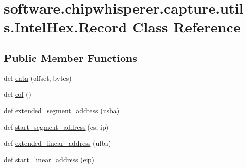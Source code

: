 \hypertarget{classsoftware_1_1chipwhisperer_1_1capture_1_1utils_1_1IntelHex_1_1Record}{}\section{software.\+chipwhisperer.\+capture.\+utils.\+Intel\+Hex.\+Record Class Reference}
\label{classsoftware_1_1chipwhisperer_1_1capture_1_1utils_1_1IntelHex_1_1Record}
\subsection*{Public Member Functions}
\begin{DoxyCompactItemize}
\item 
def \hyperlink{classsoftware_1_1chipwhisperer_1_1capture_1_1utils_1_1IntelHex_1_1Record_a1569da4fa0d9b1d4b55b231eacbd2c1a}{data} (offset, bytes)
\item 
def \hyperlink{classsoftware_1_1chipwhisperer_1_1capture_1_1utils_1_1IntelHex_1_1Record_a06ffc2b3d361d1ae984174bdf66355c4}{eof} ()
\item 
def \hyperlink{classsoftware_1_1chipwhisperer_1_1capture_1_1utils_1_1IntelHex_1_1Record_a0a701368eaee09b09a75f066c10855b1}{extended\+\_\+segment\+\_\+address} (usba)
\item 
def \hyperlink{classsoftware_1_1chipwhisperer_1_1capture_1_1utils_1_1IntelHex_1_1Record_afc7c6958ffa23dfb4806eb2700473401}{start\+\_\+segment\+\_\+address} (cs, ip)
\item 
def \hyperlink{classsoftware_1_1chipwhisperer_1_1capture_1_1utils_1_1IntelHex_1_1Record_a5dc9a50c782883c50958fe350dfecc06}{extended\+\_\+linear\+\_\+address} (ulba)
\item 
def \hyperlink{classsoftware_1_1chipwhisperer_1_1capture_1_1utils_1_1IntelHex_1_1Record_ad6f86854fcc9f437e7b26d89f54d16bd}{start\+\_\+linear\+\_\+address} (eip)
\end{DoxyCompactItemize}
